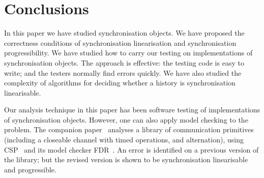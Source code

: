 \section{Conclusions}
\label{sec:conc}

In this paper we have studied synchronisation objects.  We have proposed the
correctness conditions of synchronisation linearisation and synchronisation
progressibility.  We have studied how to carry our testing on implementations
of synchronisation objects.  The approach is effective: the testing code is
easy to write; and the testers normally find errors quickly.  We have also
studied the complexity of algorithms for deciding whether a history is
synchronisation linearisable. 

Our analysis technique in this paper has been software testing of
implementations of synchronisation objects.  However, one can also apply model
checking to the problem.  The companion paper~\cite{gavin:SCL-CSP} analyses a
library of communication primitives (including a closeable channel with timed
operations, and alternation), using CSP~\cite{awr:ucs} and its model checker
FDR~\cite{fdr3}.  An error is identified on a previous version of the library;
but the revised version is shown to be synchronisation linearisable and
progressible.






